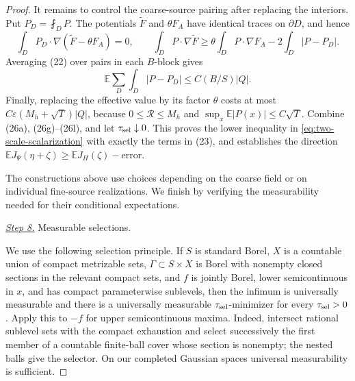 \documentclass{smfart}
\theoremstyle{definition}
\newcommand{\1}{\mathbf 1}
\begin{document}
\begin{proof}
It remains to control the coarse-source pairing after replacing the
interiors.  Put $P_ D=\fint_ DP$.  The potentials
$\widetilde F$ and $\theta F_ A$ have identical traces on
$\partial D$, and hence
\begin{equation}
\int_ DP_ D\cdot\nabla(\widetilde F-\theta F_ A)=0,
\qquad
\int_ DP\cdot\nabla\widetilde F
\geq\theta\int_ DP\cdot\nabla F_ A-2\int_ D|P-P_ D|.
\tag{26k}
\end{equation}
Averaging (22) over pairs in each $B$-block gives
\begin{equation}
\mathbb E\sum_ D\int_ D|P-P_ D|\leq C(B/S)|Q|.
\tag{26l}
\end{equation}
Finally, replacing the effective value by its factor $\theta$ costs
at most $C\varepsilon(M_ h+\sqrt T)|Q|$, because
$0\leq \mathcal R\leq M_ h$ and $\sup_ x\mathbb E|P(x)|\leq C\sqrt T$.
Combine (26a), (26g)--(26l), and let $\tau_{\rm sel}\downarrow0$.  This proves
the lower inequality in \eqref{eq:two-scale-scalarization} with exactly the terms in (23), and establishes
the direction
$\mathbb EJ_ \Psi(\eta+\zeta)\geq\mathbb EJ_ H(\zeta)-\text{error}$.

The constructions above use choices depending on the coarse field or
on individual fine-source realizations.  We finish by verifying the
measurability needed for their conditional expectations.

\smallskip\noindent
\underline{\textit{Step 8.}} Measurable selections.

We use the following selection principle.  If $S$ is standard Borel, $X$ is a
countable union of compact metrizable sets, $\Gamma\subset S\times X$
is Borel with nonempty closed sections in the relevant compact sets, and
$f$ is jointly Borel, lower semicontinuous in $x$, and has compact
parameterwise sublevels, then the infimum is universally measurable and
there is a universally measurable $\tau_{\rm sel}$-minimizer for every
$\tau_{\rm sel}>0$.  Apply this to $-f$ for upper semicontinuous maxima.
Indeed, intersect rational sublevel sets with the compact exhaustion and
select successively the first member of a countable finite-ball cover
whose section is nonempty; the nested balls give the selector.  On our
completed Gaussian spaces universal measurability is sufficient.


\end{proof}
\end{document}
